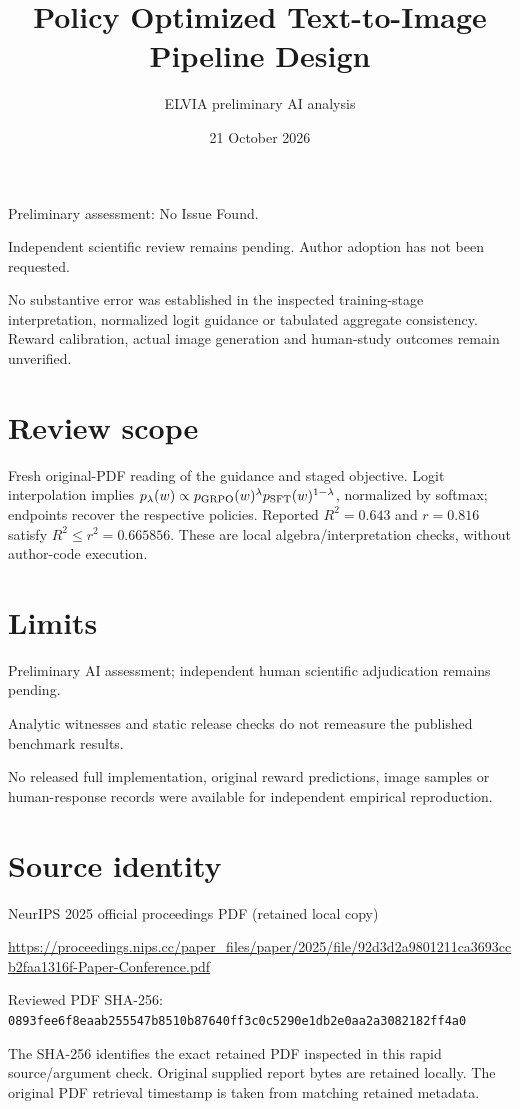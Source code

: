 \documentclass[11pt]{article}
\begin{document}
\title{Policy Optimized Text-to-Image Pipeline Design}

\author{ELVIA preliminary AI analysis}\date{21 October 2026}\maketitle

Preliminary assessment: No Issue Found.\par

Independent scientific review remains pending. Author adoption has not been requested.

No substantive error was established in the inspected training-stage interpretation, normalized logit guidance or tabulated aggregate consistency. Reward calibration, actual image generation and human-study outcomes remain unverified.

\section*{Review scope}

Fresh original-PDF reading of the guidance and staged objective. Logit interpolation implies \(p_\lambda(w)\propto p_{\rm GRPO}(w)^\lambda p_{\rm SFT}(w)^{1-\lambda}\), normalized by softmax; endpoints recover the respective policies. Reported \(R^2=0.643\) and \(r=0.816\) satisfy \(R^2\le r^2=0.665856\). These are local algebra/interpretation checks, without author-code execution.

\section*{Limits}

Preliminary AI assessment; independent human scientific adjudication remains pending.\par

Analytic witnesses and static release checks do not remeasure the published benchmark results.\par

No released full implementation, original reward predictions, image samples or human-response records were available for independent empirical reproduction.\par

\section*{Source identity}

NeurIPS 2025 official proceedings PDF (retained local copy)

\url{https://proceedings.nips.cc/paper_files/paper/2025/file/92d3d2a9801211ca3693ccb2faa1316f-Paper-Conference.pdf}

Reviewed PDF SHA-256: \nolinkurl{0893fee6f8eaab255547b8510b87640ff3c0c5290e1db2e0aa2a3082182ff4a0}

The SHA-256 identifies the exact retained PDF inspected in this rapid source/argument check. Original supplied report bytes are retained locally. The original PDF retrieval timestamp is taken from matching retained metadata.
\end{document}
